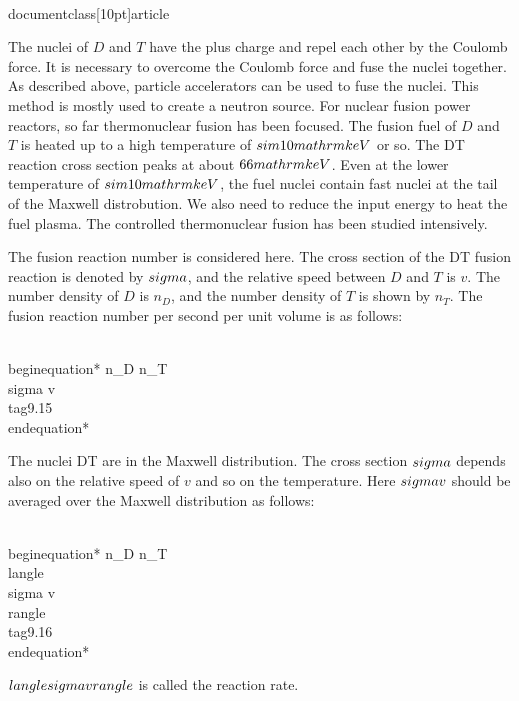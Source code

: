 \\documentclass[10pt]{article}
\begin{document}
{{{{{{The nuclei of $D$ and $T$ have the plus charge and repel each other by the Coulomb force. It is necessary to overcome the Coulomb force and fuse the nuclei together. As described above, particle accelerators can be used to fuse the nuclei. This method is mostly used to create a neutron source. For nuclear fusion power reactors, so far thermonuclear fusion has been focused. The fusion fuel of $D$ and $T$ is heated up to a high temperature of $\\sim 10 \\mathrm{keV}$ or so. The DT reaction cross section peaks at about $66 \\mathrm{keV}$. Even at the lower temperature of $\\sim 10 \\mathrm{keV}$, the fuel nuclei contain fast nuclei at the tail of the Maxwell distrobution. We also need to reduce the input energy to heat the fuel plasma. The controlled thermonuclear fusion has been studied intensively.

The fusion reaction number is considered here. The cross section of the DT fusion reaction is denoted by $\\sigma$, and the relative speed between $D$ and $T$ is $v$. The number density of $D$ is $n_{D}$, and the number density of $T$ is shown by $n_{T}$. The fusion reaction number per second per unit volume is as follows:


\\begin{equation*}
n_{D} n_{T} \\sigma v \\tag{9.15}
\\end{equation*}


The nuclei DT are in the Maxwell distribution. The cross section $\\sigma$ depends also on the relative speed of $v$ and so on the temperature. Here $\\sigma v$ should be averaged over the Maxwell distribution as follows:


\\begin{equation*}
n_{D} n_{T}\\langle\\sigma v\\rangle \\tag{9.16}
\\end{equation*}


$\\langle\\sigma v\\rangle$ is called the reaction rate.

}}}}}}
\end{document}
